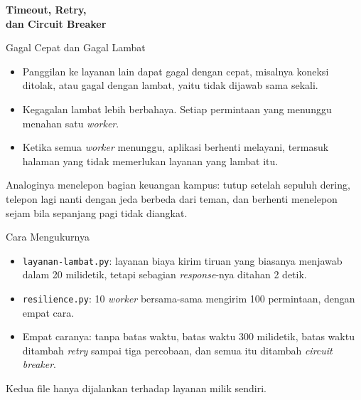 \documentclass[aspectratio=169, table, 12pt]{beamer}
\begin{document}
\begin{frame}{\hfill}
  \centering
  \Huge{\textbf{Timeout, Retry,\\dan Circuit Breaker}}
\end{frame}

\begin{frame}{{\Large Gagal Cepat dan Gagal Lambat}}
  \vspace{10pt}
  \begin{itemize}
    \item Panggilan ke layanan lain dapat gagal dengan cepat, misalnya koneksi
          ditolak, atau gagal dengan lambat, yaitu tidak dijawab sama sekali.
    \item Kegagalan lambat lebih berbahaya. Setiap permintaan yang menunggu
          menahan satu \textit{worker}.
    \item Ketika semua \textit{worker} menunggu, aplikasi berhenti melayani, termasuk
          halaman yang tidak memerlukan layanan yang lambat itu.
  \end{itemize}
  \vspace{8pt}
  {\footnotesize Analoginya menelepon bagian keuangan kampus: tutup setelah
  sepuluh dering, telepon lagi nanti dengan jeda berbeda dari teman, dan
  berhenti menelepon sejam bila sepanjang pagi tidak diangkat.}
\end{frame}

\begin{frame}{{\Large Cara Mengukurnya}}
  \vspace{10pt}
  \begin{itemize}
    \item \texttt{layanan-lambat.py}: layanan biaya kirim tiruan yang biasanya
          menjawab dalam 20 milidetik, tetapi sebagian \textit{response}-nya ditahan 2
          detik.
    \item \texttt{resilience.py}: 10 \textit{worker} bersama-sama mengirim 100
          permintaan, dengan empat cara.
    \item Empat caranya: tanpa batas waktu, batas waktu 300 milidetik, batas
          waktu ditambah \textit{retry} sampai tiga percobaan, dan semua itu
          ditambah \textit{circuit breaker}.
  \end{itemize}
  \vspace{8pt}
  {\footnotesize Kedua file hanya dijalankan terhadap layanan milik
  sendiri.}
\end{frame}
\end{document}

